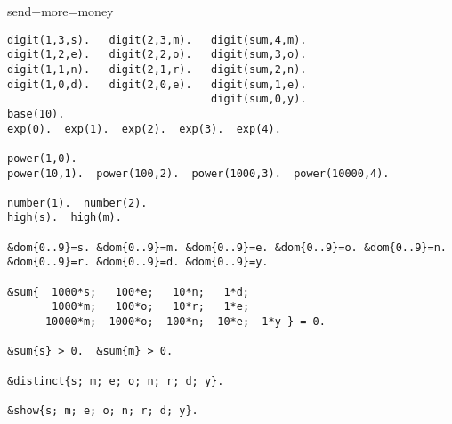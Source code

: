 \begin{frame}[fragile,shrink=1]{send+more=money}
\begin{lstlisting}
digit(1,3,s).   digit(2,3,m).   digit(sum,4,m).
digit(1,2,e).   digit(2,2,o).   digit(sum,3,o).
digit(1,1,n).   digit(2,1,r).   digit(sum,2,n).
digit(1,0,d).   digit(2,0,e).   digit(sum,1,e).
                                digit(sum,0,y).
base(10).
exp(0).  exp(1).  exp(2).  exp(3).  exp(4).

power(1,0).
power(10,1).  power(100,2).  power(1000,3).  power(10000,4).

number(1).  number(2).
high(s).  high(m).

&dom{0..9}=s. &dom{0..9}=m. &dom{0..9}=e. &dom{0..9}=o. &dom{0..9}=n. &dom{0..9}=r. &dom{0..9}=d. &dom{0..9}=y.

&sum{  1000*s;   100*e;   10*n;   1*d;
       1000*m;   100*o;   10*r;   1*e;
     -10000*m; -1000*o; -100*n; -10*e; -1*y } = 0.

&sum{s} > 0.  &sum{m} > 0.

&distinct{s; m; e; o; n; r; d; y}.

&show{s; m; e; o; n; r; d; y}.
\end{lstlisting}
\end{frame}
%
